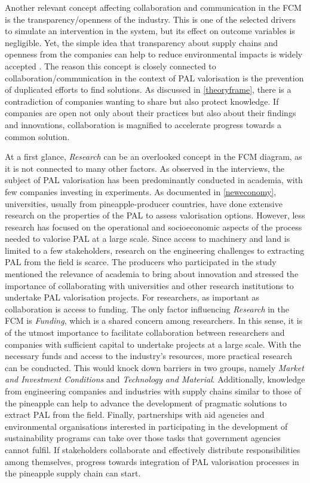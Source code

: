 Another relevant concept affecting collaboration and communication in the FCM is the transparency/openness of the industry. This is one of the selected drivers to simulate an intervention in the system, but its effect on outcome variables is negligible. Yet, the simple idea that transparency about supply chains and openness from the companies can help to reduce environmental impacts is widely accepted \citep{kashmanian2017building, jahansoozi2006organization}. The reason this concept is closely connected to collaboration/communication in the context of PAL valorisation is the prevention of duplicated efforts to find solutions. As discussed in \cref{theoryframe}, there is a contradiction of companies wanting to share but also protect knowledge. If companies are open not only about their practices but also about their findings and innovations, collaboration is magnified to accelerate progress towards a common solution.

At a first glance, \textit{Research} can be an overlooked concept in the FCM diagram, as it is not connected to many other factors. As observed in the interviews, the subject of PAL valorisation has been predominantly conducted in academia, with few companies investing in experiments. As documented in \cref{neweconomy}, universities, usually from pineapple-producer countries, have done extensive research on the properties of the PAL to assess valorisation options. However, less research has focused on the operational and socioeconomic aspects of the process needed to valorise PAL at a large scale. Since access to machinery and land is limited to a few stakeholders, research on the engineering challenges to extracting PAL from the field is scarce. The producers who participated in the study mentioned the relevance of academia to bring about innovation and stressed the importance of collaborating with universities and other research institutions to undertake PAL valorisation projects. For researchers, as important as collaboration is access to funding. The only factor influencing \textit{Research} in the FCM is \textit{Funding}, which is a shared concern among researchers. In this sense, it is of the utmost importance to facilitate collaboration between researchers and companies with sufficient capital to undertake projects at a large scale. With the necessary funds and access to the industry's resources, more practical research can be conducted. This would knock down barriers in two groups, namely \textit{Market and Investment Conditions} and \textit{Technology and Material}. Additionally, knowledge from engineering companies and industries with supply chains similar to those of the pineapple can help to advance the development of pragmatic solutions to extract PAL from the field. Finally, partnerships with aid agencies and environmental organisations interested in participating in the development of sustainability programs can take over those tasks that government agencies cannot fulfil. If stakeholders collaborate and effectively distribute responsibilities among themselves, progress towards integration of PAL valorisation processes in the pineapple supply chain can start. 

